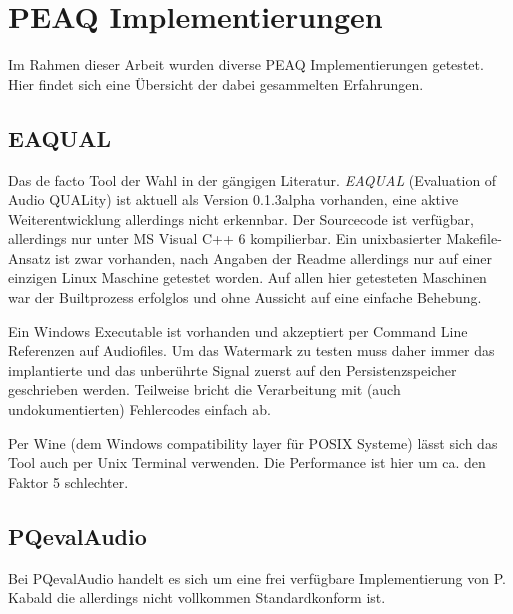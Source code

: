 \chapter{PEAQ Implementierungen}
\label{ch:peaq}

Im Rahmen dieser Arbeit wurden diverse PEAQ Implementierungen getestet. Hier findet sich eine Übersicht der dabei gesammelten Erfahrungen.

\section{EAQUAL}

Das de facto Tool der Wahl in der gängigen Literatur\cite{xiang2007robust}\cite{kraetzer2006transparency}. \textit{EAQUAL} (Evaluation of Audio QUALity) ist aktuell als Version 0.1.3alpha vorhanden, eine aktive Weiterentwicklung allerdings nicht erkennbar. Der Sourcecode ist verfügbar, allerdings nur unter MS Visual C++ 6 kompilierbar. Ein unixbasierter Makefile-Ansatz ist zwar vorhanden, nach Angaben der Readme allerdings nur auf einer einzigen Linux Maschine getestet worden. Auf allen hier getesteten Maschinen war der Builtprozess erfolglos und ohne Aussicht auf eine einfache Behebung. 

Ein Windows Executable ist vorhanden und akzeptiert per Command Line Referenzen auf Audiofiles. Um das Watermark zu testen muss daher immer das implantierte und das unberührte Signal zuerst auf den Persistenzspeicher geschrieben werden. Teilweise bricht die Verarbeitung mit (auch undokumentierten) Fehlercodes einfach ab.

Per Wine (dem Windows compatibility layer für POSIX Systeme) lässt sich das Tool auch per Unix Terminal verwenden. Die Performance ist hier um ca. den Faktor 5 schlechter.

\section{PQevalAudio}

Bei PQevalAudio handelt es sich um eine frei verfügbare Implementierung von P. Kabald\cite{kabal2002examination} die allerdings nicht vollkommen Standardkonform ist.

